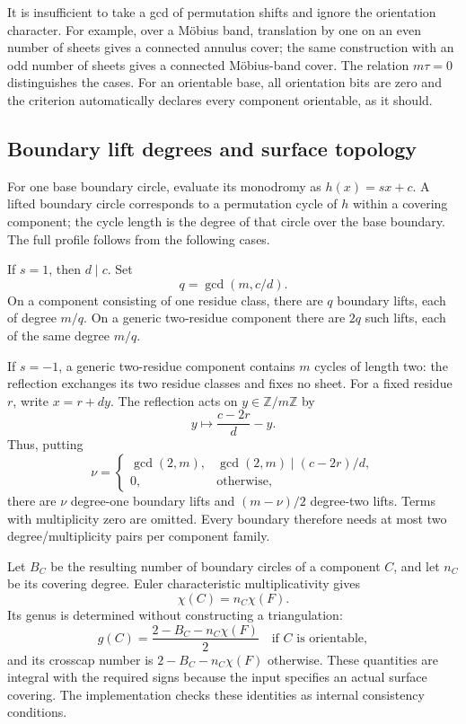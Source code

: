 It is insufficient to take a gcd of permutation shifts and ignore the
orientation character.  For example, over a M\"obius band, translation
by one on an even number of sheets gives a connected annulus cover;
the same construction with an odd number of sheets gives a connected
M\"obius-band cover.  The relation $m\tau=0$ distinguishes the cases.
For an orientable base, all orientation bits are zero and the criterion
automatically declares every component orientable, as it should.

\subsection{Boundary lift degrees and surface topology}

For one base boundary circle, evaluate its monodromy as
$h(x)=s x+c$.  A lifted boundary circle corresponds to a permutation
cycle of $h$ within a covering component; the cycle length is the degree
of that circle over the base boundary.  The full profile follows from
the following cases.

If $s=1$, then $d\mid c$.  Set
\[
 q=\gcd(m,c/d).
\]
On a component consisting of one residue class, there are $q$ boundary
lifts, each of degree $m/q$.  On a generic two-residue component there
are $2q$ such lifts, each of the same degree $m/q$.

If $s=-1$, a generic two-residue component contains $m$ cycles of
length two: the reflection exchanges its two residue classes and fixes
no sheet.  For a fixed residue $r$, write $x=r+dy$.  The reflection
acts on $y\in\mathbb Z/m\mathbb Z$ by
\[
 y\longmapsto\frac{c-2r}{d}-y.
\]
Thus, putting
\begin{equation}
 \nu=\begin{cases}
 \gcd(2,m),&\gcd(2,m)\mid(c-2r)/d,\\
 0,&\text{otherwise},
 \end{cases}
 \label{eq:dihedral-boundary-fixed}
\end{equation}
there are $\nu$ degree-one boundary lifts and $(m-\nu)/2$ degree-two
lifts.  Terms with multiplicity zero are omitted.  Every boundary
therefore needs at most two degree/multiplicity pairs per component
family.

Let $B_C$ be the resulting number of boundary circles of a component
$C$, and let $n_C$ be its covering degree.  Euler characteristic
multiplicativity gives
\[
 \chi(C)=n_C\chi(F).
\]
Its genus is determined without constructing a triangulation:
\[
 g(C)=\frac{2-B_C-n_C\chi(F)}2
 \quad\text{if }C\text{ is orientable},
\]
and its crosscap number is $2-B_C-n_C\chi(F)$ otherwise.  These
quantities are integral with the required signs because the input
specifies an actual surface covering.  The implementation checks these
identities as internal consistency conditions.

